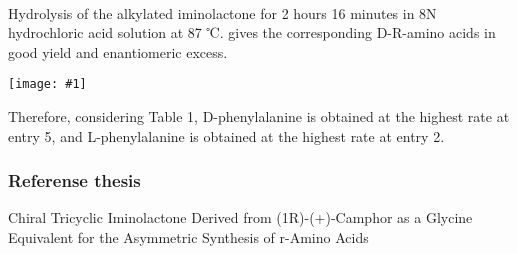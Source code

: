 \documentclass[a4paper,papersize,dvipdfmx]{jsarticle}
\newcommand{\pict}[2]{\begin{center} \texttt{[image: \#1]} \end{center}}   %
\begin{document}
\

Hydrolysis of the alkylated iminolactone for 2 hours 16 minutes in 8N hydrochloric acid solution at 87 ℃. gives the corresponding D-R-amino acids in good yield and enantiomeric excess.

\pict{imgs-k/hk3.jpeg}{12}

Therefore, considering Table 1, D-phenylalanine is obtained at the highest rate at entry 5, and L-phenylalanine is obtained at the highest rate at entry 2.


\subsubsection*{Referense thesis}
Chiral Tricyclic Iminolactone Derived from (1R)-(+)-Camphor as a Glycine Equivalent for the Asymmetric Synthesis of r-Amino Acids
\end{document}
